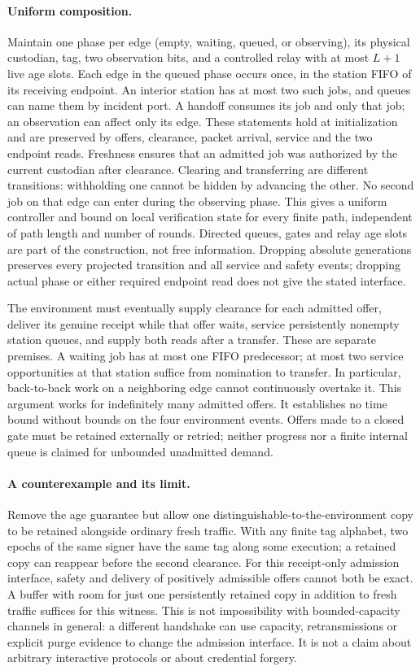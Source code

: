 \documentclass[11pt]{article}
\begin{document}
\paragraph{Uniform composition.}
Maintain one phase per edge (empty, waiting, queued, or observing), its
physical custodian, tag, two observation bits, and a controlled relay with
at most \(L+1\) live age slots. Each edge in the queued phase occurs once,
in the station FIFO of its receiving endpoint. An interior station has at
most two such jobs, and queues can name them by incident port. A handoff
consumes its job and only that job; an observation can affect only its edge.
These statements hold at initialization and are preserved by offers,
clearance, packet arrival, service and the two endpoint reads. Freshness
ensures that an admitted job was authorized by the current custodian after
clearance. Clearing and transferring are different transitions: withholding
one cannot be hidden by advancing the other. No second job on that edge can
enter during the observing phase. This gives a uniform controller and bound
on local verification state for every finite path, independent of path
length and number of rounds. Directed queues, gates and relay age slots
are part of the construction, not free information. Dropping absolute
generations preserves every projected transition and all service and safety
events; dropping actual phase or either required endpoint read does not
give the stated interface.

The environment must eventually supply clearance for each admitted offer,
deliver its genuine receipt while that offer waits, service persistently
nonempty station queues, and supply both reads after a transfer. These
are separate premises. A waiting job has at most one FIFO predecessor;
at most two service opportunities at that station suffice from nomination
to transfer. In particular, back-to-back work on a neighboring edge
cannot continuously overtake it. This argument works for indefinitely
many admitted offers. It establishes no time bound without bounds on the
four environment events. Offers made to a closed gate must be retained
externally or retried; neither progress nor a finite internal queue is
claimed for unbounded unadmitted demand.

\paragraph{A counterexample and its limit.}
Remove the age guarantee but allow one distinguishable-to-the-environment
copy to be retained alongside ordinary fresh traffic. With any finite
tag alphabet, two epochs of the same signer have the same tag along some
execution; a retained copy can reappear before the second clearance. For
this receipt-only admission interface, safety and delivery of positively
admissible offers cannot both be exact. A buffer with room for just one
persistently retained copy in addition to fresh traffic suffices for this
witness. This is not impossibility with bounded-capacity channels in general:
a different handshake can use capacity, retransmissions or explicit
purge evidence to change the admission interface. It is not a claim about
arbitrary interactive protocols or about credential forgery.
\end{document}
